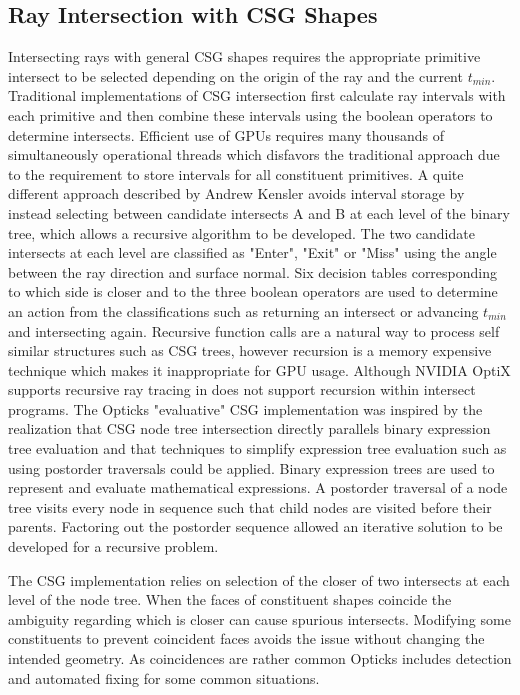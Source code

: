 \documentclass{webofc}
\begin{document}
\subsection{Ray Intersection with CSG Shapes}
\label{intersection}
%
Intersecting rays with general CSG shapes requires the appropriate primitive intersect to be 
selected depending on the origin of the ray and the current $t_{min}$. Traditional implementations of CSG intersection first calculate 
ray intervals with each primitive and then combine these intervals using the boolean operators to determine intersects.  
Efficient use of GPUs requires many thousands of simultaneously operational threads which disfavors the traditional approach due to 
the requirement to store intervals for all constituent primitives.  A quite different approach
described by Andrew Kensler\cite{kensler} avoids interval storage by instead selecting between 
candidate intersects A and B at each level of the binary tree, which allows a recursive algorithm 
to be developed. The two candidate intersects at each level are classified as "Enter", "Exit" or "Miss" 
using the angle between the ray direction and surface normal. Six decision tables corresponding to which side is closer and 
to the three boolean operators are used to determine an action from the classifications such as returning an intersect 
or advancing $t_{min}$ and intersecting again. 
Recursive function calls are a natural way to process self similar structures such as CSG trees,  
however recursion is a memory expensive technique which makes it inappropriate for GPU usage.
Although NVIDIA OptiX supports recursive ray tracing in does not support recursion within intersect programs. 
The Opticks "evaluative" CSG implementation was inspired by the realization that CSG node tree intersection 
directly parallels binary expression tree evaluation and that techniques to simplify expression 
tree evaluation such as using postorder traversals could be applied. 
Binary expression trees are used to represent and evaluate mathematical expressions. 
A postorder traversal of a node tree visits every node in sequence such that
child nodes are visited before their parents.
Factoring out the postorder sequence allowed an iterative solution to be developed 
for a recursive problem.  

The CSG implementation relies on selection of the closer of two intersects at each level 
of the node tree. When the faces of constituent shapes coincide the ambiguity regarding which is closer
can cause spurious intersects. Modifying some constituents to prevent coincident faces avoids 
the issue without changing the intended geometry. As coincidences are rather common Opticks includes 
detection and automated fixing for some common situations.        
%
\end{document}
